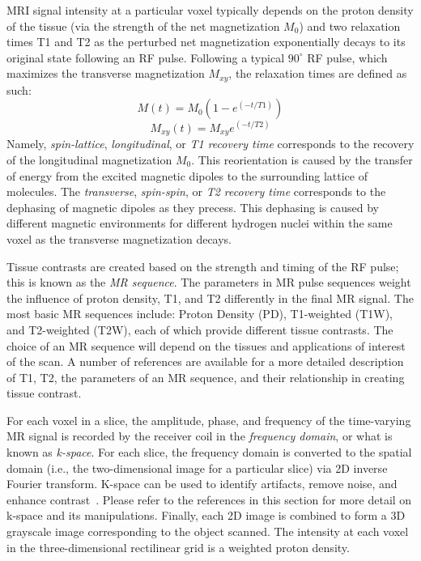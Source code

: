 MRI signal intensity at a particular voxel typically depends on the proton density of the tissue (via the strength of the net magnetization $M_0$) and two relaxation times T1 and T2 as the perturbed net magnetization exponentially decays to its original state following an RF pulse. Following a typical $90^{\circ}$ RF pulse, which maximizes the transverse magnetization $M_{xy}$, the relaxation times are defined as such:
\begin{equation}
M(t) = M_0(1 - e^{(-t/T1)})
\end{equation}
\begin{equation}
M_{xy}(t) = M_{xy}e^{(-t/T2)}
\end{equation}
Namely, \textit{spin-lattice}, \textit{longitudinal}, or \textit{T1 recovery time} corresponds to the recovery of the longitudinal magnetization $M_0$. This reorientation is caused by the transfer of energy from the excited magnetic dipoles to the surrounding lattice of molecules. The \textit{transverse}, \textit{spin-spin}, or \textit{T2 recovery time} corresponds to the dephasing of magnetic dipoles as they precess. This dephasing is caused by different magnetic environments for different hydrogen nuclei within the same voxel as the transverse magnetization decays.

Tissue contrasts are created based on the strength and timing of the RF pulse; this is known as the \textit{MR sequence}. The parameters in MR pulse sequences weight the influence of proton density, T1, and T2 differently in the final MR signal. The most basic MR sequences include: Proton Density (PD), T1-weighted (T1W), and T2-weighted (T2W), each of which provide different tissue contrasts. The choice of an MR sequence will depend on the tissues and applications of interest of the scan. A number of references are available  \cite{nishimura_2010, brown_semelka_2003, webb_2003} for a more detailed description of T1, T2, the parameters of an MR sequence, and their relationship in creating tissue contrast.

For each voxel in a slice, the amplitude, phase, and frequency of the time-varying MR signal is recorded by the receiver coil in the \textit{frequency domain}, or what is known as \textit{k-space}. For each slice, the frequency domain is converted to the spatial domain (i.e., the two-dimensional image for a particular slice) via 2D inverse Fourier transform. K-space can be used to identify artifacts, remove noise, and enhance contrast~\cite{imaios}. Please refer to the references in this section for more detail on k-space and its manipulations. Finally, each 2D image is combined to form a 3D grayscale image corresponding to the object scanned. The intensity at each voxel in the three-dimensional rectilinear grid is a weighted proton density.

